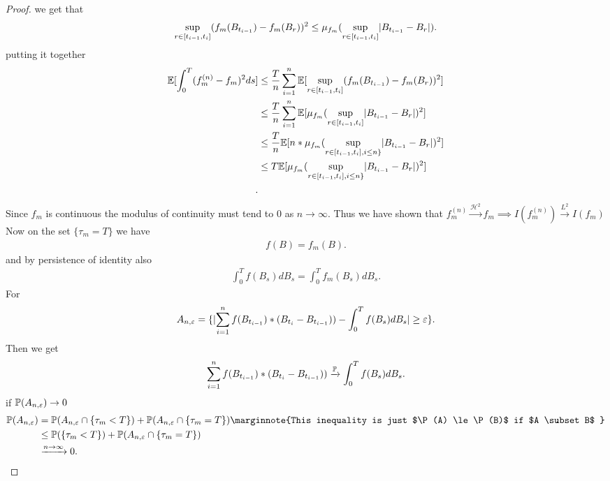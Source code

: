 \begin{proof}
we get that
\begin{align*}
  \sup_{r \in [t_{i-1},t_{i}]}(f_m(B_{t_{i-1}})-f_m(B_r))^2  \le \mu_{f_m}(\sup_{r \in [t_{i-1},t_i]} \abs{B_{t_{i-1}}-B_r})  
.\end{align*}
putting it together
\begin{align*}
  \E[\int_0^{T}  (f_m^{(n)} - f_m )^2 ds] &\le    \frac{T}{n} \sum_{i=1}^{n} \E[\sup_{r \in [t_{i-1},t_{i}]}(f_m(B_{t_{i-1}})-f_m(B_r))^2 ] \\
                                          &\le  \frac{T}{n} \sum_{i=1}^{n} \E[ \mu_{f_m}(\sup_{r \in [t_{i-1},t_i]} \abs{B_{t_{i-1}}-B_r})^2] \\
                                          &\le  \frac{T}{n} \E[n* \mu_{f_m}(\sup_{r \in [t_{i-1},t_i],i\le n\}  } \abs{B_{t_{i-1}}-B_r})^2] \\
                                          &\le  T \E[\mu_{f_m}(\sup_{r \in [t_{i-1},t_i],i\le n\}  } \abs{B_{t_{i-1}}-B_r})^2] \\
.\end{align*}
Since $f_m$ is continuous the modulus of continuity must tend to 0 as $n\to \infty$.
Thus we have shown that $f_m^{(n)} \xrightarrow{\mathcal{H}^2} f_m  \implies I(f_m^{(n)} ) \xrightarrow{L^2} I(f_m)$\\
Now on the set $\{\tau_m = T\}  $ we have 
\begin{align*}
  f(B) = f_m(B) 
.\end{align*}
and  by persistence of identity also 
\begin{align*}
  \int_0^{T} f(B_s) dB_s = \int_0^{T}   f_m(B_s) dB_s
.\end{align*}
For 
\begin{align*}
  A_{n,\epsilon } = \{\abs{\sum_{i=1}^{n} f(B_{t_{i-1}})*(B_{t_i}-B_{t_{i-1}}))  - \int_0^{T} f(B_s) dB_s } \ge  \epsilon\}  
.\end{align*}
Then we get 
\begin{align*}
\sum_{i=1}^{n} f(B_{t_{i-1}})*(B_{t_i}-B_{t_{i-1}}))  \xrightarrow{\P} \int_0^{T} f(B_s) dB_s 
.\end{align*}
if $\P(A_{n,\epsilon}) \to 0$ 
\begin{align*}
  \P(A_{n,\epsilon}) &= \P(A_{n,\epsilon} \cap \{\tau_m < T\} ) + \P(A_{n,\epsilon} \cap \{\tau_m = T\} ) \marginnote{This inequality is just $\P(A) \le  \P(B)$ if $A \subset B$ } \\
                     &\le  \P(\{\tau_m < T\} ) + \P(A_{n,\epsilon} \cap \{\tau_m = T\} ) \\ 
                     &\xrightarrow{n\to \infty} 0 
.\end{align*}
\end{proof}
